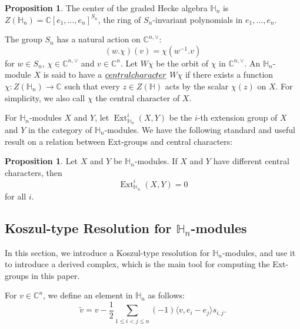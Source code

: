 \documentclass[11pt]{amsart}
\numberwithin{equation}{section}
\theoremstyle{definition}
\newtheorem{proposition}[thm]{Proposition}
\begin{document}
\begin{proposition}\cite[Proposition 4.5]{lusztig1989affine}
    The center of the graded Hecke algebra $\mathbb{H}_n$ is $Z(\mathbb H_n)=\mathbb C[e_1,\ldots, e_n]^{S_n}$, the ring of $S_n$-invariant polynomials in $e_1, \ldots, e_n$.
\end{proposition}

The group $S_{n}$ has a natural action on $\mathbb{C}^{n,\vee}$:
\begin{equation*}
    (w.\chi)(v)=\chi(w^{-1}.v)
\end{equation*}
for $w\in S_{n}$, $\chi\in \mathbb{C}^{n,\vee}$ and $v\in \mathbb{C}^{n}$. Let $W\chi$ be the orbit of $\chi$ in $\mathbb{C}^{n,\vee}$. An $\mathbb{H}_{n}$-module $X$ is
said to have a $\emph{central character}$ $W\chi$ if there exists a function
$\chi\colon Z(\mathbb H_{n})\to\mathbb C$ such that every $z\in Z(\mathbb H)$ acts
by the scalar $\chi(z)$ on $X$. For simplicity, we also call $\chi$ the central character of $X$. 

For $\mathbb H_{n}$-modules $X$ and $Y$, let $\operatorname{Ext}_{\mathbb H_{n}}^i(X,Y)$
be the $i$-th extension group of $X$ and $Y$ in the category of $\mathbb H_{n}$-modules. We have the following standard and useful result on a relation between Ext-groups and central characters: 

\begin{proposition} \label{prop cc vanish}
    Let $X$ and $Y$ be $\mathbb H_{n}$-modules. If $X$ and $Y$ have different central characters, then 
    \[ \operatorname{Ext}_{\mathbb H_{n}}^i(X,Y)=0 \] for all $i$.
\end{proposition}



\subsection{Koszul-type Resolution for $\mathbb{H}_{n}$-modules} \label{ss koszul resol}
In this section, we introduce a Koszul-type resolution for $\mathbb{H}_{n}$-modules, and use it to introduce a derived complex, which is the main tool for computing the Ext-groups in this paper.


For $v\in \mathbb{C}^{n}$, we define an element in $\mathbb{H}_{n}$ as follows:
\begin{equation}\label{eq:v-tilde}
  \widetilde{v}
  =v-\frac12\sum_{1\leq i<j\leq n}
  (-1)\langle v,e_{i}-e_{j}\rangle s_{i,j}.
\end{equation}
\end{document}
